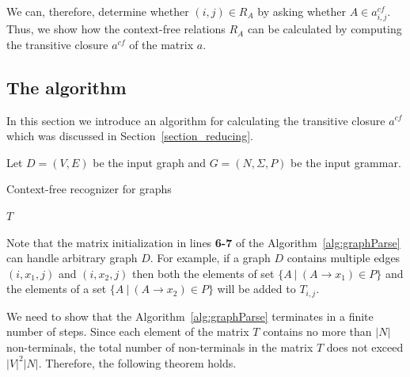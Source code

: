 \documentclass[runningheads,a4paper]{llncs}
\begin{document}
We can, therefore, determine whether $(i,j) \in R_A$ by asking whether $A \in a^{cf}_{i,j}$. Thus, we show how the context-free relations $R_A$ can be calculated by computing the transitive closure $a^{cf}$ of the matrix $a$.



\subsection{The algorithm} \label{section_algorithm}
In this section we introduce an algorithm for calculating the transitive closure $a^{cf}$ which was discussed in Section~\ref{section_reducing}.

Let $D = (V, E)$ be the input graph and $G = (N,\Sigma,P)$ be the input grammar.

\begin{algorithm}[H]
	\begin{algorithmic}[1]
		\caption{Context-free recognizer for graphs}
		\label{alg:graphParse}
		
		\EndFor    
		
		\EndWhile
		\State \Return $T$
		\EndFunction
	\end{algorithmic}
\end{algorithm}

Note that the matrix initialization in lines \textbf{6-7} of the Algorithm~\ref{alg:graphParse} can handle arbitrary graph $D$. For example, if a graph $D$ contains multiple edges $(i,x_1,j)$ and $(i,x_2,j)$ then both the elements of set $\{A~|~(A \rightarrow x_1) \in P \}$ and the elements of a set $\{A~|~(A \rightarrow x_2) \in P \}$ will be added to $T_{i,j}$.

We need to show that the Algorithm~\ref{alg:graphParse} terminates in a finite number of steps. Since each element of the matrix $T$ contains no more than $|N|$ non-terminals, the total number of non-terminals in the matrix $T$ does not exceed $|V|^2|N|$. Therefore, the following theorem holds.
\end{document}
